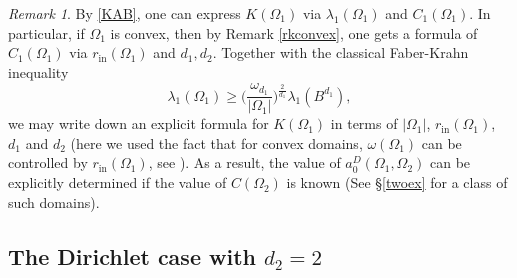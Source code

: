 \documentclass[11pt,letterpaper]{amsart}
\numberwithin{equation}{section}
\theoremstyle{plain}
\theoremstyle{plain}
\numberwithin{equation}{section}
\theoremstyle{remark}
\newtheorem{remark}[theorem]{Remark}
\begin{document}
	\begin{remark}\label{explicityconsforconv}
		By \eqref{KAB}, one can express $K(\Omega_1)$ via $\lambda_1(\Omega_1)$ and $C_1(\Omega_1)$. In particular, if $\Omega_1$ is convex, then by Remark \ref{rkconvex}, one gets a formula of $C_1(\Omega_1)$ via $r_{\mathrm {in}}(\Omega_1)$ and $d_1, d_2$. Together with the classical Faber-Krahn inequality 
		\[
		\lambda_1(\Omega_1)\ge \big(\frac{\omega_{d_1}}{|\Omega_1|}\big)^{\frac 2{d_1}}\lambda_1(B^{d_1}),
		\]
	we may write down an explicit formula for  $K(\Omega_1)$ in terms of $|\Omega_1|$, $r_{\mathrm {in}}(\Omega_1)$, $d_1$ and $d_2$ (here we used the fact that for convex domains, $\omega(\Omega_1)$ can be controlled by $r_{\mathrm {in}}(\Omega_1)$, see \cite[Theorem 10.12.2]{Sch14}).  As a result, the value of $a_0^D(\Omega_1, \Omega_2)$ can be explicitly determined if the value of  $C(\Omega_2)$ is known (See \S \ref{twoex} for a class of such domains). 
	\end{remark}
	
	\subsection{The Dirichlet case with  $d_2= 2$}	\label{subsec22}
	
\end{document}
